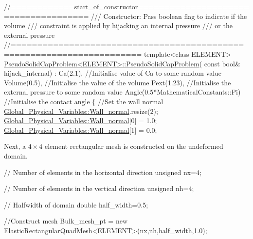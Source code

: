 \begin{DoxyCodeInclude}
\textcolor{comment}{//============start\_of\_constructor=====================================}
\textcolor{comment}{/// Constructor: Pass boolean flag to indicate if the volume}
\textcolor{comment}{}\textcolor{comment}{/// constraint is applied by hijacking an internal pressure}
\textcolor{comment}{}\textcolor{comment}{/// or the external pressure}
\textcolor{comment}{}\textcolor{comment}{//======================================================================}
\textcolor{keyword}{template}<\textcolor{keyword}{class} ELEMENT>
\hyperlink{classPseudoSolidCapProblem_a4ac05a07dd55950bb67f7f79cb9fbb77}{PseudoSolidCapProblem<ELEMENT>::PseudoSolidCapProblem}(\textcolor{keyword}{
      const} \textcolor{keywordtype}{bool}& hijack\_internal) :
 Ca(2.1),       \textcolor{comment}{//Initialise value of Ca to some random value}
 Volume(0.5),   \textcolor{comment}{//Initialise the value of the volume }
 Pext(1.23),    \textcolor{comment}{//Initialise the external pressure to some random value}
 Angle(0.5*MathematicalConstants::Pi) \textcolor{comment}{//Initialise the contact angle}
\{
 \textcolor{comment}{//Set the wall normal}
 \hyperlink{namespaceGlobal__Physical__Variables_af3a3b98f9f5b354d01228884e49c5bf0}{Global\_Physical\_Variables::Wall\_normal}.resize(2);
 \hyperlink{namespaceGlobal__Physical__Variables_af3a3b98f9f5b354d01228884e49c5bf0}{Global\_Physical\_Variables::Wall\_normal}[0] = 1.0; 
 \hyperlink{namespaceGlobal__Physical__Variables_af3a3b98f9f5b354d01228884e49c5bf0}{Global\_Physical\_Variables::Wall\_normal}[1] = 0.0;

\end{DoxyCodeInclude}


Next, a $ 4 \times 4 $ element rectangular mesh is constructed on the undeformed domain.


\begin{DoxyCodeInclude}

 \textcolor{comment}{// Number of elements in the horizontal direction}
 \textcolor{keywordtype}{unsigned} nx=4;

 \textcolor{comment}{// Number of elements in the vertical direction}
 \textcolor{keywordtype}{unsigned} nh=4;

 \textcolor{comment}{// Halfwidth of domain}
 \textcolor{keywordtype}{double} half\_width=0.5;

 \textcolor{comment}{//Construct mesh}
 Bulk\_mesh\_pt = \textcolor{keyword}{new} ElasticRectangularQuadMesh<ELEMENT>(nx,nh,half\_width,1.0);

\end{DoxyCodeInclude}


